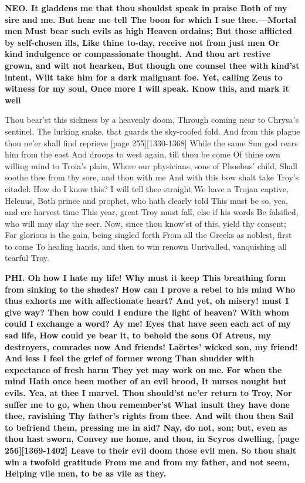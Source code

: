 \documentclass[11pt,letter]{book}
\begin{document}
\par \textbf{NEO. It gladdens me that thou shouldst speak in praise Both of my sire and me. But hear me tell The boon for which I sue thee.—Mortal men Must bear such evils as high Heaven ordains; But those afflicted by self-chosen ills, Like thine to-day, receive not from just men Or kind indulgence or compassionate thought. And thou art restive grown, and wilt not hearken, But though one counsel thee with kind’st intent, Wilt take him for a dark malignant foe. Yet, calling Zeus to witness for my soul, Once more I will speak. Know this, and mark it well}
\par   Thou bear’st this sickness by a heavenly doom, Through coming near to Chrysa’s sentinel, The lurking snake, that guards the sky-roofed fold. And from this plague thou ne’er shall find reprieve [page 255][1330-1368] While the same Sun god rears him from the east And droops to west again, till thou be come Of thine own willing mind to Troia’s plain, Where our physicians, sons of Phoebus’ child, Shall soothe thee from thy sore, and thou with me And with this bow shalt take Troy’s citadel. How do I know this? I will tell thee straight We have a Trojan captive, Helenus, Both prince and prophet, who hath clearly told This must be so, yea, and ere harvest time This year, great Troy must fall, else if his words Be falsified, who will may slay the seer. Now, since thou know’st of this, yield thy consent; For glorious is the gain, being singled forth From all the Greeks as noblest, first to come To healing hands, and then to win renown Unrivalled, vanquishing all tearful Troy.

\par \textbf{PHI. Oh how I hate my life! Why must it keep This breathing form from sinking to the shades? How can I prove a rebel to his mind Who thus exhorts me with affectionate heart? And yet, oh misery! must I give way? Then how could I endure the light of heaven? With whom could I exchange a word? Ay me! Eyes that have seen each act of my sad life, How could ye bear it, to behold the sons Of Atreus, my destroyers, comrades now And friends! Laërtes’ wicked son, my friend! And less I feel the grief of former wrong Than shudder with expectance of fresh harm They yet may work on me. For when the mind Hath once been mother of an evil brood, It nurses nought but evils. Yea, at thee I marvel. Thou should’st ne’er return to Troy, Nor suffer me to go, when thou remember’st What insult they have done thee, ravishing Thy father’s rights from thee. And wilt thou then Sail to befriend them, pressing me in aid? Nay, do not, son; but, even as thou hast sworn, Convey me home, and thou, in Scyros dwelling, [page 256][1369-1402] Leave to their evil doom those evil men. So thou shalt win a twofold gratitude From me and from my father, and not seem, Helping vile men, to be as vile as they.}
\par 
\end{document}
